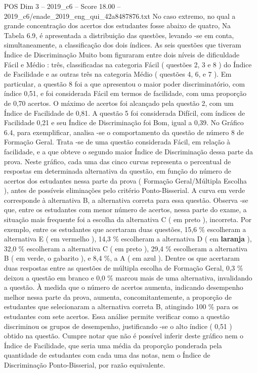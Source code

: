 \begin{textsample}{POS Dim 3 – 2019\_c6 – Score 18.00 – 2019\_c6/enade\_2019\_eng\_qui\_42a8487876.txt}
No caso extremo, no qual a grande concentração dos acertos dos estudantes fosse abaixo de quatro, Na Tabela 6.9, é apresentada a distribuição das questões, levando -se em conta, simultaneamente, a classificação dos dois índices.
As seis questões que tiveram Índice de Discriminação Muito bom figuraram entre dois níveis de dificuldade Fácil e Médio : três, classificadas na categoria Fácil ( questões 2, 3 e 8 ) do Índice de Facilidade e as outras três na categoria Médio ( questões 4, 6, e 7 ).
Em particular, a questão 8 foi a que apresentou o maior poder discriminatório, com índice 0,51, e foi considerada Fácil em termos de facilidade, com uma proporção de 0,70 acertos.
O máximo de acertos foi alcançado pela questão 2, com um Índice de Facilidade de 0,81.
A questão 5 foi considerada Difícil, com índices de Facilidade 0,21 e seu Índice de Discriminação foi Bom, igual a 0,39.
No Gráfico 6.4, para exemplificar, analisa -se o comportamento da questão de número 8 de Formação Geral.
Trata -se de uma questão considerada Fácil, em relação à facilidade, e a que obteve o segundo maior Índice de Discriminação dessa parte da prova.
Neste gráfico, cada uma das cinco curvas representa o percentual de respostas em determinada alternativa da questão, em função do número de acertos dos estudantes nessa parte da prova ( Formação Geral/Múltipla Escolha ), antes de possíveis eliminações pelo critério Ponto-Bisserial.
A curva em verde corresponde à alternativa B, a alternativa correta para essa questão.
Observa -se que, entre os estudantes com menor número de acertos, nessa parte do exame, a situação mais frequente foi a escolha da alternativa C ( em preto ), incorreta.
Por exemplo, entre os estudantes que acertaram duas questões, 15,6 \% escolheram a alternativa E ( em vermelho ), 14,3 \% escolheram a alternativa D ( em \textbf{laranja} ), 32,0 \% escolheram a alternativa C ( em preto ), 29,4 \% escolheram a alternativa B ( em verde, o gabarito ), e 8,4 \%, a A ( em azul ).
Dentre os que acertaram duas respostas entre as questões de múltipla escolha de Formação Geral, 0,3 \% deixou a questão em branco e 0,0 \% marcou mais de uma alternativa, invalidando a questão.
À medida que o número de acertos aumenta, indicando desempenho melhor nessa parte da prova, aumenta, concomitantemente, a proporção de estudantes que selecionaram a alternativa correta B, atingindo 100 \% para os estudantes com sete acertos.
Essa análise permite verificar como a questão discriminou os grupos de desempenho, justificando -se o alto índice ( 0,51 ) obtido na questão.
Cumpre notar que não é possível inferir deste gráfico nem o Índice de Facilidade, que seria uma média da proporção ponderada pela quantidade de estudantes com cada uma das notas, nem o Índice de Discriminação Ponto-Bisserial, por razão equivalente.

\end{textsample}

